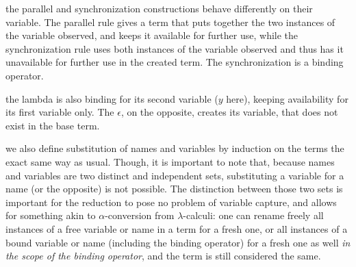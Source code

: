 \remark the parallel and synchronization constructions behave differently on their variable. The parallel rule gives a term that puts together the two instances of the variable observed, and keeps it available for further use, while the synchronization rule uses both instances of the variable observed and thus has it unavailable for further use in the created term. The synchronization is a binding operator.

\remark the lambda is also binding for its second variable ($y$ here), keeping availability for its first variable only. The $\epsilon$, on the opposite, creates its variable, that does not exist in the base term.

\remark we also define substitution of names and variables by induction on the terms the exact same way as usual. Though, it is important to note that, because names and variables are two distinct and independent sets, substituting a variable for a name (or the opposite) is not possible. The distinction between those two sets is important for the reduction to pose no problem of variable capture, and allows for something akin to $\alpha$-conversion from $\lambda$-calculi: one can rename freely all instances of a free variable or name in a term for a fresh one, or all instances of a bound variable or name (including the binding operator) for a fresh one as well \emph{in the scope of the binding operator}, and the term is still considered the same.\\

